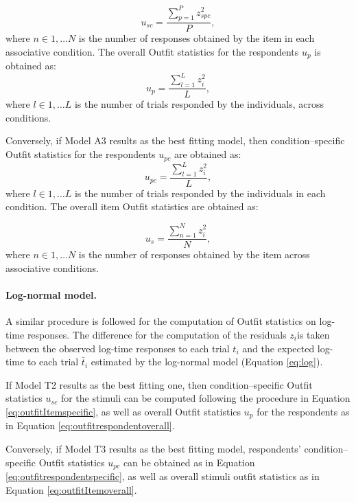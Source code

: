 \documentclass[12pt]{book}
\begin{document}
\begin{equation}\label{eq:outfitItemspecific}
	u_{sc} = \frac{\displaystyle\sum_{p=1}^{P}z_{spc}^2}{P},
\end{equation}
where $n \in {1, \ldots N}$ is the number of responses obtained by the item in each associative condition. 
The overall Outfit statistics for the respondents $u_p$ is obtained as: 
\begin{equation}\label{eq:outfitrespondentoverall}
	u_p = \frac{\displaystyle\sum_{l=1}^{L}z_i^2}{L},
\end{equation}
where $l \in {1, \ldots L}$ is the number of trials responded by the individuals, across conditions. 

Conversely, if Model A3 results as the best fitting model, then condition--specific Outfit statistics for the respondents $u_{pc}$ are obtained as:  
\begin{equation}\label{eq:outfitrespondentspecific}
	u_{pc} = \frac{\displaystyle\sum_{l=1}^{L}z_i^2}{L},
\end{equation}
where $l \in {1, \ldots L}$ is the number of trials responded by the individuals in each condition.
The overall item Outfit statistics are obtained as: 

\begin{equation}\label{eq:outfitItemoverall}
	u_{s} = \frac{\displaystyle\sum_{n=1}^{N}z_i^2}{N},
\end{equation}
where $n \in {1, \ldots N}$ is the number of responses obtained by the item across associative conditions. 


\paragraph{Log-normal model.}
A similar procedure is followed for the computation of Outfit statistics on log-time responses. 
The difference for the computation of the residuals $z_i $is taken between the observed log-time responses to each trial $t_i$ and the expected log-time to each trial $\bar t_i$ estimated by the log-normal model (Equation \ref{eq:log}). 

If Model T2 results as the best fitting one, then condition--specific Outfit statistics $u_{sc}$ for the stimuli can be computed following the procedure in Equation \ref{eq:outfitItemspecific}, as well as overall Outfit statistics $u_p$ for the respondents as in Equation \ref{eq:outfitrespondentoverall}. 

Conversely, if Model T3 results as the best fitting model, respondents' condition--specific Outfit statistics $u_{pc}$ can be obtained as in Equation \ref{eq:outfitrespondentspecific}, as well as overall stimuli outfit statistics as in Equation \ref{eq:outfitItemoverall}.
\end{document}
